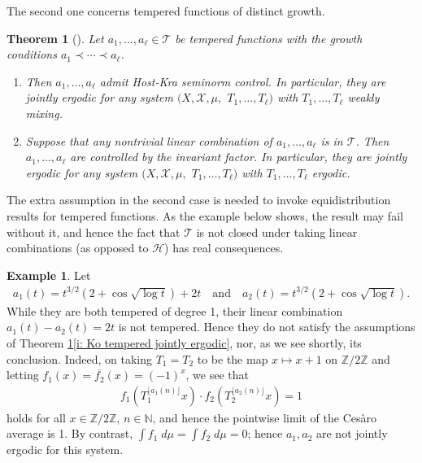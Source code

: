 \documentclass[11pt]{amsart}
\newtheorem{theorem}[lemma]{Theorem}
\theoremstyle{definition}
\newtheorem{example}[lemma]{Example}
\DeclareMathOperator*{\E}{\mathbb{E}}
\newcommand{\N}{{\mathbb N}}
\newcommand{\Z}{{\mathbb Z}}
\newcommand{\CH}{{\mathcal H}}
\newcommand{\CT}{{\mathcal T}}
\newcommand{\CX}{{\mathcal X}}
\newcommand{\1}{{\mathbf{1}}}
\newcommand{\sfloor}[1]{{\lfloor #1 \rfloor}}
\begin{document}
The second one concerns tempered functions of distinct growth. %
\begin{theorem}[{\cite[Proposition 2.5, Corollary 2.6, Corollary 2.7]{Kouts21}}]\label{T: Ko tempered}
    Let $a_1, \ldots, a_\ell\in \CT$ be tempered functions with the growth conditions $a_1 \prec \cdots \prec a_\ell$.
    \begin{enumerate}
        \item Then $a_1, \ldots, a_\ell$ admit Host-Kra seminorm control. %
        In particular, they are jointly ergodic for any system $(X, \CX, \mu,$\! $T_1, \ldots, T_\ell)$ with $T_1, \ldots, T_\ell$ weakly mixing. 
        \item\label{i: Ko tempered jointly ergodic} Suppose that any nontrivial linear combination of $a_1, \ldots, a_\ell$ is in $\CT$. Then $a_1, \ldots, a_\ell$ are controlled by the invariant factor. %
        In particular, they are jointly ergodic for any system $(X, \CX, \mu,$\! $T_1, \ldots, T_\ell)$ with $T_1, \ldots, T_\ell$ ergodic. 
    \end{enumerate}
\end{theorem}
The extra assumption in the second case is needed to invoke equidistribution results for tempered functions. As the example below shows, the result may fail without it, and hence the fact that $\CT$ is not closed under taking linear combinations (as opposed to $\CH$) has real consequences.  
\begin{example}
    Let
    \begin{align*}
     a_1(t) = t^{3/2}(2 + \cos\sqrt{\log t})+2t\quad \textrm{and}\quad a_2(t) = t^{3/2}(2 + \cos\sqrt{\log t}). 
    \end{align*}
    While they are both tempered of degree 1, their linear combination $a_1(t)-a_2(t) = 2t$ is not tempered.
    Hence they do not satisfy the assumptions of Theorem \ref{T: Ko tempered}\eqref{i: Ko tempered jointly ergodic}, nor, as we see shortly, its conclusion. Indeed, on taking $T_1 = T_2$ to be the map $x\mapsto x +1$ on $\Z/2\Z$ and letting $f_1(x)=\overline{f_2}(x) = (-1)^x$, we see that
    \begin{align*}
        f_1(T_1^{\sfloor{a_1(n)}}x)\cdot f_2(T_2^{\sfloor{a_2(n)}}x) = 1
    \end{align*}
    holds for all $x\in \Z/2\Z$, $n\in\N$, and hence the pointwise limit of the Ces\`aro average is 1.
    By contrast, $\int f_1\; d\mu  = \int f_2\; d\mu = 0$; hence $a_1, a_2$ are not jointly ergodic for this system. %
\end{example}
\end{document}
